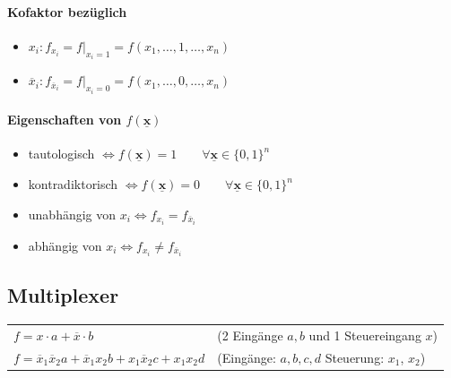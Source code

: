 \documentclass[6pt,a4paper]{scrartcl}
\renewcommand{\vec}[1]{\ensuremath{\underline{\boldsymbol {#1}}}}
\newcommand{\ol}[1]{\ensuremath{\overline{#1}}}									%
\renewcommand{\vec}[1]{\ensuremath{\underline{\boldsymbol {#1}}}}
\begin{document}
\begin{multicols*}{3}
	\paragraph{Kofaktor bezüglich}
	\begin{itemize}\itemsep0pt
	\item $x_i: f_{x_i}=f|_{x_i=1}=f(x_1,\dots,1,\dots,x_n)$
	\item $\overline x_i: f_{\overline x_i}=f|_{x_i=0}=f(x_1,\dots,0,\dots,x_n)$
	\end{itemize}
	\paragraph{Eigenschaften von $f(\vec{x})$}
	\begin{itemize}\itemsep0pt
		\item tautologisch $\Leftrightarrow f(\vec{x})=1 \qquad \forall \vec x \in \{0,1\}^n$
		\item kontradiktorisch $\Leftrightarrow f(\vec{x})=0 \qquad \forall \vec x \in \{0,1\}^n$
		\item unabhängig von $x_i \Leftrightarrow f_{x_i} = f_{\overline x_i}$
		\item abhängig von $x_i \Leftrightarrow f_{x_i} \ne f_{\overline x_i}$
	\end{itemize}

	\subsection{Multiplexer}
	\begin{tabular}{ll}
		$f = x \cdot a + \overline x \cdot b$ & (2 Eingänge $a,b$ und 1 Steuereingang $x$)\\
		$f = \ol x_1 \ol x_2 a + \ol x_1 x_2 b + x_1  \ol x_2 c + x_1 x_2d$ & (Eingänge: $a,b,c,d$  Steuerung: $x_1$, $x_2$)\\
	\end{tabular}


\end{multicols*}
\end{document}
